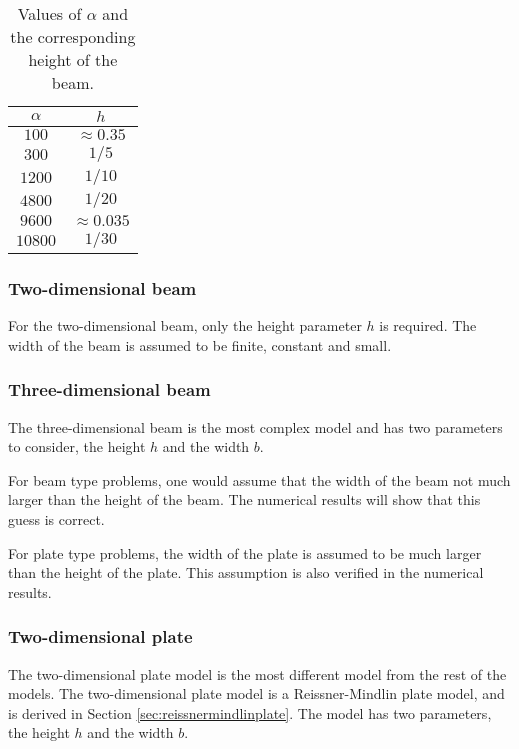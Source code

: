 \documentclass[../../main.tex]{subfiles}
\begin{document}
\begin{table}[h]
	\centering
	\begin{tabular}{|c|c|}
		\hline
		$\alpha$ & $h$\\
		\hline
		$100$ & $\approx 0.35$ \\
		$300$ & $1/5$ \\
		$1200$ & $1/10$ \\
		$4800$ & $1/20$ \\
		$9600$ & $\approx 0.035$ \\
		$10800$ & $1/30$ \\
		\hline
	\end{tabular}
	\caption{Values of $\alpha$ and the corresponding height of the beam.}
	\label{tab:alphaheight}
\end{table}

\subsubsection{Two-dimensional beam}

For the two-dimensional beam, only the height parameter $h$ is required. The width of the beam is assumed to be finite, constant and small. 

\subsubsection{Three-dimensional beam}
The three-dimensional beam is the most complex model and has two parameters to consider, the height $h$ and the width $b$.

For beam type problems, one would assume that the width of the beam not much larger than the height of the beam. The numerical results will show that this guess is correct.

For plate type problems, the width of the plate is assumed to be much larger than the height of the plate. This assumption is also verified in the numerical results.

\subsubsection{Two-dimensional plate}
The two-dimensional plate model is the most different model from the rest of the models. The two-dimensional plate model is a Reissner-Mindlin plate model, and is derived in Section \ref{sec:reissnermindlinplate}. The model has two parameters, the height $h$ and the width $b$.

\end{document}
